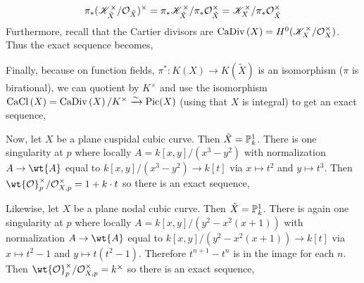 \documentclass[12pt]{article}
\begin{document}
\[ \pi_*(\K_{\tilde{X}}^\times / \struct{\tilde{X}})^\times = \pi_* \K_{\tilde{X}}^\times / \pi_* \struct{\tilde{X}}^\times = \K_X^\times / \pi_* \struct{\tilde{X}}^\times \]
Furthermore, recall that the Cartier divisors are $\CaDiv{X} = H^0(\K_X^\times / \struct{X}^\times)$. Thus the exact sequence becomes,
\begin{center}
\end{center}
Finally, because on function fields, $\pi^* : K(X) \to K(\tilde{X})$ is an isomorphism ($\pi$ is birational), we can quotient by $K^\times$ and use the isomorphism $\CaCl{X} = \CaDiv{X} / K^\times \iso \Pic{X}$ (using that $X$ is integral) to get an exact sequence,
\begin{center}
\end{center}
Now, let $X$ be a plane cuspidal cubic curve. Then $\tilde{X} = \P^1_k$. There is one singularity at $p$ where locally $A = k[x, y]/(x^3 - y^2)$ with normalization $A \to \wt{A}$ equal to $k[x,y]/(x^3 - y^2) \to k[t]$ via $x \mapsto t^2$ and $y \mapsto t^3$. Then $\wt{\mathcal{O}}_p^\times / \stalk{X}{p}^\times = 1 + k \cdot t$ so there is an exact sequence,
\begin{center}
\end{center}
Likewise, let $X$ be a plane nodal cubic curve. Then $\tilde{X} = \P^1_k$. There is again one singularity at $p$ where locally $A = k[x, y]/(y^2 - x^2(x+1))$ with normalization $A \to \wt{A}$ equal to $k[x,y]/(y^2 - x^2(x+1)) \to k[t]$ via $x \mapsto t^2 - 1$ and $y \mapsto t(t^2 - 1)$. Therefore $t^{n+1} - t^n$ is in the image for each $n$. Then $\wt{\mathcal{O}}_p^\times / \stalk{X}{p}^\times = k^\times$ so there is an exact sequence,
\begin{center}
\end{center}
\end{document}
